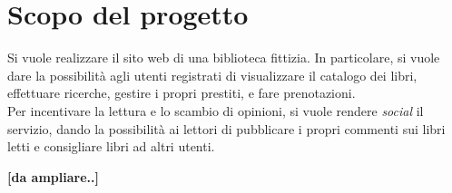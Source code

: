 \section{Scopo del progetto}
Si vuole realizzare il sito web di una biblioteca fittizia. In particolare, si vuole dare la possibilità agli utenti registrati di visualizzare il catalogo dei libri, effettuare ricerche, gestire i propri prestiti, e fare prenotazioni.\\
Per incentivare la lettura e lo scambio di opinioni, si vuole rendere \textit{social} il servizio, dando la possibilità ai lettori di pubblicare i propri commenti sui libri letti e consigliare libri ad altri utenti.



\textbf{[da ampliare..]}

\newpage